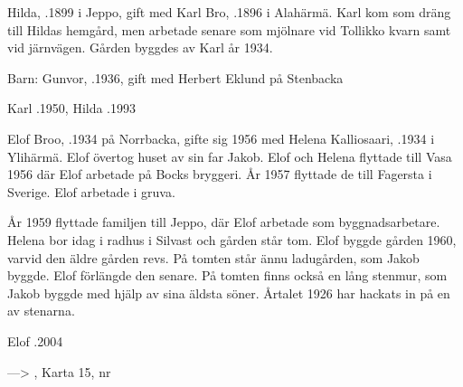 Hilda, .1899 i Jeppo, gift med Karl Bro, .1896 i Alahärmä. Karl kom som dräng till Hildas hemgård, men arbetade senare som mjölnare vid Tollikko kvarn samt vid järnvägen. Gården byggdes av Karl år 1934.

Barn: Gunvor, .1936, gift med Herbert Eklund på Stenbacka

Karl .1950, Hilda .1993




Elof Broo, .1934 på Norrbacka, gifte sig 1956 med Helena Kalliosaari, .1934 i Ylihärmä. Elof övertog huset av sin far Jakob. Elof och Helena flyttade till Vasa 1956 där Elof arbetade på Bocks bryggeri. År 1957 flyttade de till Fagersta i Sverige. Elof arbetade i gruva.
\begin{jhchildren}
  \item {}
  \item {}
  \item {}
  \item {}
\end{jhchildren}
 År 1959 flyttade familjen till Jeppo, där Elof arbetade som byggnadsarbetare. Helena bor idag i radhus i Silvast och gården står tom. Elof byggde gården 1960, varvid den äldre gården revs. På tomten står ännu ladugården, som Jakob byggde. Elof förlängde den senare. På tomten finns också en lång stenmur, som Jakob byggde med hjälp av sina äldsta söner. Årtalet 1926 har hackats in på en av stenarna.

Elof .2004


---> , Karta 15, nr 


